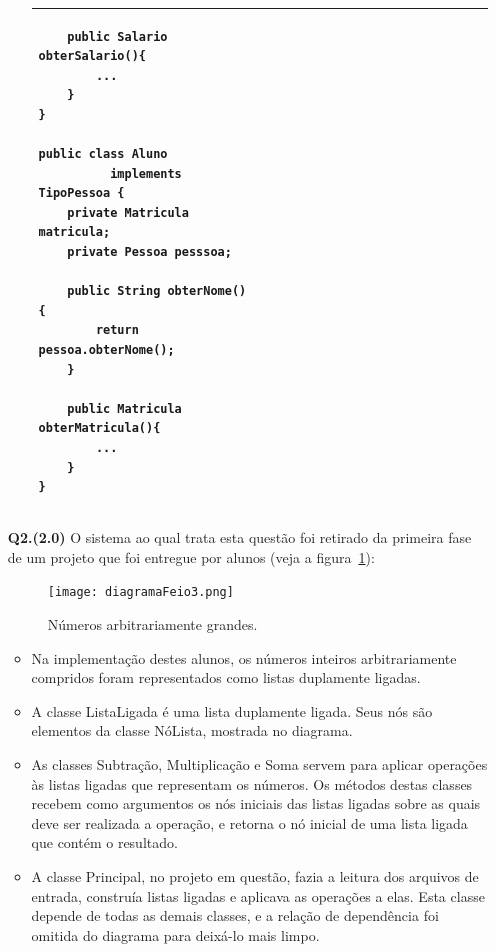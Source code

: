 \documentclass[11pt]{article}
\begin{document}
\begin{itemize}
\begin{itemize}
\begin{tabular}{|p{0.5\linewidth}|p{0.5\linewidth}|}
\begin{verbatim}
    public Salario obterSalario(){ 
        ...
    }
}

public class Aluno 
          implements TipoPessoa {
    private Matricula matricula;
    private Pessoa pesssoa;
    
    public String obterNome(){
        return pessoa.obterNome();
    }
    
    public Matricula obterMatricula(){
        ...
    }
}
    \end{verbatim}
     \\ \hline
    
    \end{tabular}


\end{itemize}

\newpage
\item[{\bf Q2.(2.0)}] O sistema ao qual trata esta questão foi retirado da
  primeira fase de um projeto que foi entregue por alunos (veja a figura~\ref{figNum}):

\begin{figure}[htb]
\begin{center}
\texttt{[image: diagramaFeio3.png]}
\end{center}
\caption{Números arbitrariamente grandes.}
\label{figNum}
\end{figure}

\begin{itemize}
\item Na implementação destes alunos, os números inteiros arbitrariamente
compridos foram  representados como listas duplamente ligadas. 
\item A classe ListaLigada é uma lista duplamente ligada. Seus nós são
  elementos da classe NóLista, mostrada no diagrama. 
\item As classes Subtração, Multiplicação e Soma servem para aplicar
  operações às listas ligadas que representam os números. Os métodos
  destas classes recebem como argumentos os nós iniciais das listas
  ligadas sobre as quais deve ser realizada a operação, e retorna o nó
  inicial de uma lista ligada que contém o resultado. 
\item A classe Principal, no projeto em questão, fazia a leitura dos
  arquivos de entrada, construía listas ligadas e aplicava as
  operações a elas. Esta classe depende de todas as demais classes, e
  a relação de dependência foi omitida do diagrama para deixá-lo mais
  limpo. 
\end{itemize}


\end{itemize}
\end{document}
